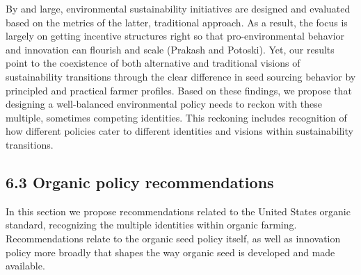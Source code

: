 \documentclass[twoside,12pt,final]{ucthesis-CA2012}
\begin{document}
\begin{ucmainmatter}
By and large, environmental sustainability initiatives are designed and
evaluated based on the metrics of the latter, traditional approach. As a
result, the focus is largely on getting incentive structures right so
that pro-environmental behavior and innovation can flourish and scale
(Prakash and Potoski). Yet, our results point to the coexistence of both
alternative and traditional visions of sustainability transitions
through the clear difference in seed sourcing behavior by principled and
practical farmer profiles. Based on these findings, we propose that
designing a well-balanced environmental policy needs to reckon with
these multiple, sometimes competing identities. This reckoning includes
recognition of how different policies cater to different identities and
visions within sustainability transitions.

\hypertarget{organic-policy-recommendations}{%
\subsection{6.3 Organic policy recommendations}\label{organic-policy-recommendations}}

In this section we propose recommendations related to the United States
organic standard, recognizing the multiple identities within organic
farming. Recommendations relate to the organic seed policy itself, as
well as innovation policy more broadly that shapes the way organic seed
is developed and made available.


\end{ucmainmatter}
\end{document}
